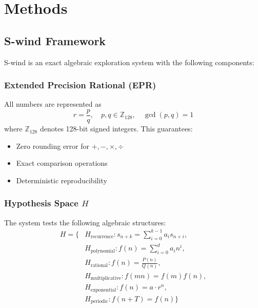 \documentclass[twocolumn,showpacs,preprintnumbers,amsmath,amssymb,prl]{revtex4-2}
\begin{document}
\section{Methods}

\subsection{S-wind Framework}

S-wind is an exact algebraic exploration system with the following components:

\subsubsection{Extended Precision Rational (EPR)}

All numbers are represented as
\begin{equation}
    r = \frac{p}{q}, \quad p, q \in \mathbb{Z}_{128}, \quad \gcd(p, q) = 1
\end{equation}
where $\mathbb{Z}_{128}$ denotes 128-bit signed integers. This guarantees:
\begin{itemize}
    \item Zero rounding error for $+, -, \times, \div$
    \item Exact comparison operations
    \item Deterministic reproducibility
\end{itemize}

\subsubsection{Hypothesis Space $H$}

The system tests the following algebraic structures:
\begin{align}
    H = \{ &H_{\text{recurrence}}: s_{n+k} = \sum_{i=0}^{k-1} a_i s_{n+i}, \\
           &H_{\text{polynomial}}: f(n) = \sum_{i=0}^{d} a_i n^i, \\
           &H_{\text{rational}}: f(n) = \frac{P(n)}{Q(n)}, \\
           &H_{\text{multiplicative}}: f(mn) = f(m)f(n), \\
           &H_{\text{exponential}}: f(n) = a \cdot r^n, \\
           &H_{\text{periodic}}: f(n+T) = f(n) \}
\end{align}
\end{document}
